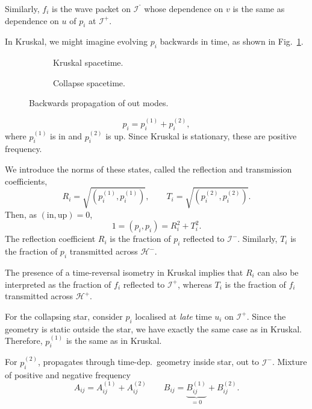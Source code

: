 Similarly, $f_i$ is the wave packet on $\mathscr{I}^⁻$ whose dependence on $v$ is the same as dependence on $u$ of $p_i$ at $\mathscr{I}^+$.

In Kruskal, we might imagine evolving $p_i$ backwards in time, as shown in Fig.~\ref{fig:l22f11}.
\begin{figure}[tbhp]
  \begin{subfigure}[b]{0.5\textwidth}
    \centering
    \caption{Kruskal spacetime.}
    \label{fig:l22f11}
  \end{subfigure}
  \begin{subfigure}[b]{0.5\textwidth}
    \centering
    \caption{Collapse spacetime.}
    \label{fig:l22f12}
  \end{subfigure}
  \caption{Backwards propagation of out modes.}
\end{figure}
\begin{equation}
  p_i = p_i^{(1)} + p_i^{(2)},
\end{equation}
where $p_i^{(1)}$ is in and $p_i^{(2)}$ is up.
Since Kruskal is stationary, these are positive frequency.

We introduce the norms of these states, called the reflection and transmission coefficients,
\begin{equation}
  R_i = \sqrt{(p_i^{(1)}, p_{i}^{(1)})}, \qquad T_i = \sqrt{(p_i^{(2)}, p_{i}^{(2)})}.
\end{equation}
Then, as $(\text{in}, \text{up}) = 0$,
\begin{equation}
  1 = (p_i, p_i) = R_i^2 + T_i^2.
\end{equation}
The reflection coefficient $R_i$ is the fraction of $p_i$ reflected to $\mathscr{I}^-$.
Similarly, $T_i$ is the fraction of $p_i$ transmitted across $\mathcal{H}^-$.

The presence of a time-reversal isometry in Kruskal implies that $R_i$ can also be interpreted as the fraction of $f_i$ reflected to $\mathscr{I}^+$, whereas $T_i$ is the fraction of $f_i$ transmitted across $\mathcal{H}^+$.

For the collapsing star, consider $p_i$ localised at \emph{late} time $u_i$ on $\mathscr{I}^+$.
Since the geometry is static outside the star, we have exactly the same case as in Kruskal. Therefore, $p_i^{(1)}$ is the same as in Kruskal.

For $p_i^{(2)}$, propagates through time-dep.~geometry inside star, out to $\mathscr{I}^-$.
Mixture of positive and negative frequency 
\begin{equation}
  A_{ij} = A_{ij}^{(1)} + A_{ij}^{(2)} \qquad B_{ij} = \underbrace{B_{ij}^{(1)}}_{= 0} + B_{ij}^{(2)}.
\end{equation}

